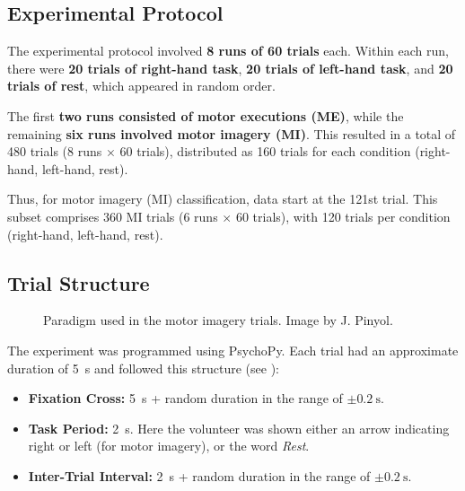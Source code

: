 \documentclass[11pt]{exam}
\begin{document}
\begin{appendices}
        \subsection{Experimental Protocol}

        The experimental protocol involved \textbf{8 runs of 60 trials} each. Within each run, there were \textbf{20 trials of right-hand task}, \textbf{20 trials of left-hand task}, and \textbf{20 trials of rest}, which appeared in random order.

        The first \textbf{two runs consisted of motor executions (ME)}, while the remaining \textbf{six runs involved motor imagery (MI)}. This resulted in a total of 480 trials (8 runs $\times$ 60 trials), distributed as 160 trials for each condition (right-hand, left-hand, rest).

        Thus, for motor imagery (MI) classification, data start at the 121st trial. This subset comprises 360 MI trials (6 runs $\times$ 60 trials), with 120 trials per condition (right-hand, left-hand, rest).

        \subsection{Trial Structure}
        \begin{figure}[htbp] %
            \centering
            \caption{Paradigm used in the motor imagery trials. Image by J. Pinyol.}
            \label{fig:paradigm}
        \end{figure}
        The experiment was programmed using PsychoPy. Each trial had an approximate duration of \SI{5}{\second} and followed this structure (see ): %
        \begin{itemize}
            \item \textbf{Fixation Cross:} \SI{5}{\second} + random duration in the range of $\pm\SI{0.2}{\second}$.
            \item \textbf{Task Period:} \SI{2}{\second}. Here the volunteer was shown either an arrow indicating right or left (for motor imagery), or the word \emph{Rest}.
            \item \textbf{Inter-Trial Interval:} \SI{2}{\second} + random duration in the range of $\pm\SI{0.2}{\second}$.
        \end{itemize}


\end{appendices}
\end{document}
